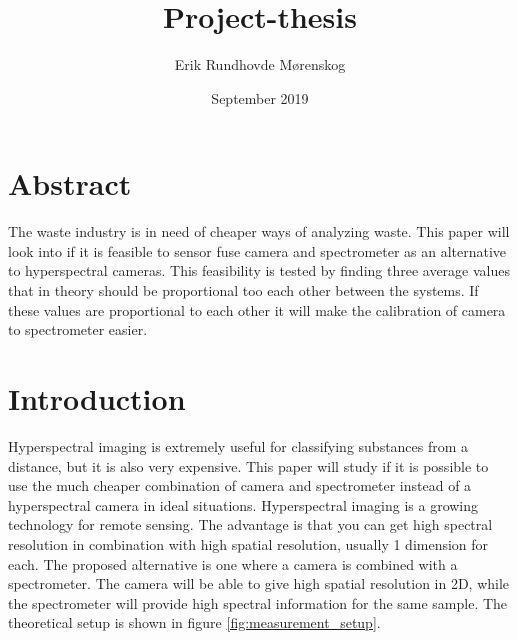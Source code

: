 \documentclass{article}
\title{Project-thesis}
\author{Erik Rundhovde M\o renskog}
\date{September 2019}
\begin{document}
\maketitle

\tableofcontents

\section{Abstract}
The waste industry is in need of cheaper ways of analyzing waste. This paper will look into if it is feasible to sensor fuse camera and spectrometer as an alternative to hyperspectral cameras. This feasibility is tested by finding three average values that in theory should be proportional too each other between the systems. If these values are proportional to each other it will make the calibration of camera to spectrometer easier.


\section{Introduction}
Hyperspectral imaging is extremely useful for classifying substances from a distance, but it is also very expensive. This paper will study if it is possible to use the much cheaper combination of camera and spectrometer instead of a hyperspectral camera in ideal situations. 
Hyperspectral imaging is a growing technology for remote sensing. The advantage is that you can get high spectral resolution in combination with high spatial resolution, usually 1 dimension for each. The proposed alternative is one where a camera is combined with a spectrometer. The camera will be able to give high spatial resolution in 2D, while the spectrometer will provide high spectral information for the same sample. The theoretical setup is shown in figure \ref{fig:measurement_setup}. 

\end{document}
